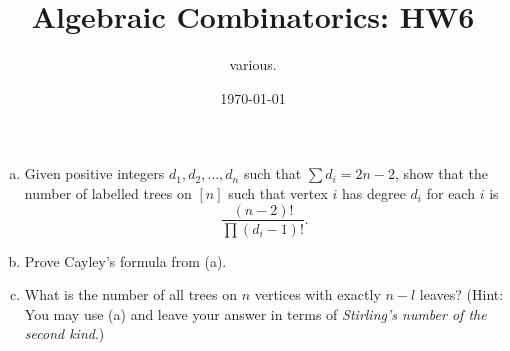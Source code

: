 \documentclass[11pt]{article}
\title{Algebraic Combinatorics: HW6}
\author{various.}
\date{\today}
\begin{document}
\maketitle
\begin{quest}[\textcolor{red}{Trees with prescribed degrees and Cayley's formula}]
    \begin{enumerate}[(a)]\phantom{0}
        
        \item Given positive integers $d_1,d_2,\dots,d_n$ such that $\sum d_i=2n-2$, show that the number of labelled trees on $[n]$ such that vertex $i$ has degree $d_i$ for each $i$ is \[\frac{(n-2)!}{\prod(d_i-1)!}.\]
        \item Prove Cayley's formula from (a).
        \item What is the number of all trees on $n$ vertices with exactly $n-l$ leaves? (Hint: You may use (a) and leave your answer in terms of \textit{Stirling's number of the second kind}.)
    \end{enumerate}
\end{quest}
\end{document}
